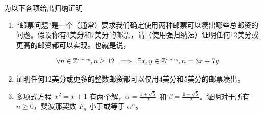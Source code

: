
为以下各项给出归纳证明
\begin{enumerate}
\item “邮票问题”是一个（通常）要求我们确定使用两种邮票可以凑出哪些总邮资的问题。假设你有3美分和7美分的邮票，请（使用强归纳法）证明任何12美分或更高的邮资都可以实现。也就是说，

\[ \forall n \in {\mathbb Z}^{\mbox{\tiny noneg}}, n \geq 12 \; \implies \; \exists x,y \in {\mathbb Z}^{\mbox{\tiny noneg}} , n = 3x + 7y.
\]
 
 \wbvfill

\workbookpagebreak

\item 证明任何12美分或更多的整数邮资都可以仅用4美分和5美分的邮票凑出。
\wbvfill


\item 多项式方程 $x^2 = x+1$ 有两个解，$\alpha = \frac{1+\sqrt{5}}{2}$ 和 $\beta = \frac{1-\sqrt{5}}{2}$。证明对于所有 $n \geq 0$，斐波那契数 $F_n$ 小于或等于 $\alpha^{n}$。
\wbvfill

\workbookpagebreak

\end{enumerate}


